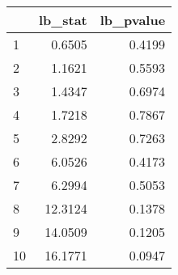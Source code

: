 \begin{tabular}{lrr}
\toprule
{} &  lb\_stat &  lb\_pvalue \\
\midrule
1  &   0.6505 &     0.4199 \\
2  &   1.1621 &     0.5593 \\
3  &   1.4347 &     0.6974 \\
4  &   1.7218 &     0.7867 \\
5  &   2.8292 &     0.7263 \\
6  &   6.0526 &     0.4173 \\
7  &   6.2994 &     0.5053 \\
8  &  12.3124 &     0.1378 \\
9  &  14.0509 &     0.1205 \\
10 &  16.1771 &     0.0947 \\
\bottomrule
\end{tabular}
